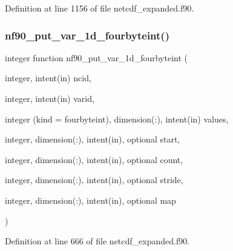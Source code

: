 Definition at line 1156 of file netcdf\+\_\+expanded.\+f90.

\mbox{\label{netcdf__expanded_8f90_a4b7dfb2e70e89cd2afb94ca46daed7c8}} 
\subsubsection{\texorpdfstring{nf90\+\_\+put\+\_\+var\+\_\+1d\+\_\+fourbyteint()}{nf90\_put\_var\_1d\_fourbyteint()}}
{\footnotesize\ttfamily integer function nf90\+\_\+put\+\_\+var\+\_\+1d\+\_\+fourbyteint (\begin{DoxyParamCaption}\item[{integer, intent(in)}]{ncid,  }\item[{integer, intent(in)}]{varid,  }\item[{integer (kind = fourbyteint), dimension(\+:), intent(in)}]{values,  }\item[{integer, dimension(\+:), intent(in), optional}]{start,  }\item[{integer, dimension(\+:), intent(in), optional}]{count,  }\item[{integer, dimension(\+:), intent(in), optional}]{stride,  }\item[{integer, dimension(\+:), intent(in), optional}]{map }\end{DoxyParamCaption})}



Definition at line 666 of file netcdf\+\_\+expanded.\+f90.

\mbox{\label{netcdf__expanded_8f90_ac29e46e571b90c53d69fa36d404252e9}} 
